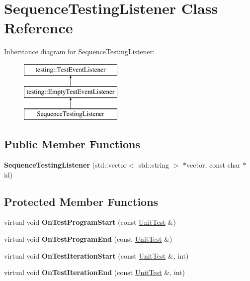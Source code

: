 \hypertarget{class_sequence_testing_listener}{}\section{Sequence\+Testing\+Listener Class Reference}
\label{class_sequence_testing_listener}
Inheritance diagram for Sequence\+Testing\+Listener\+:\begin{figure}[H]
\begin{center}
\leavevmode
\includegraphics[height=3.000000cm]{class_sequence_testing_listener}
\end{center}
\end{figure}
\subsection*{Public Member Functions}
\begin{DoxyCompactItemize}
\item 
\mbox{\label{class_sequence_testing_listener_ac0fcb350d20876f8273621ad4c79ba7a}} 
{\bfseries Sequence\+Testing\+Listener} (std\+::vector$<$ std\+::string $>$ $\ast$vector, const char $\ast$id)
\end{DoxyCompactItemize}
\subsection*{Protected Member Functions}
\begin{DoxyCompactItemize}
\item 
\mbox{\label{class_sequence_testing_listener_a25b96acdbaa6f582e583e6b56bd39b42}} 
virtual void {\bfseries On\+Test\+Program\+Start} (const \mbox{\hyperlink{classtesting_1_1_unit_test}{Unit\+Test}} \&)
\item 
\mbox{\label{class_sequence_testing_listener_aacac5e15bac089460841ff63a5c31f57}} 
virtual void {\bfseries On\+Test\+Program\+End} (const \mbox{\hyperlink{classtesting_1_1_unit_test}{Unit\+Test}} \&)
\item 
\mbox{\label{class_sequence_testing_listener_a345641262fa10cc4b251ac54116db74b}} 
virtual void {\bfseries On\+Test\+Iteration\+Start} (const \mbox{\hyperlink{classtesting_1_1_unit_test}{Unit\+Test}} \&, int)
\item 
\mbox{\label{class_sequence_testing_listener_a783bc01e2a95f5bf73bbde4d96832e0f}} 
virtual void {\bfseries On\+Test\+Iteration\+End} (const \mbox{\hyperlink{classtesting_1_1_unit_test}{Unit\+Test}} \&, int)
\end{DoxyCompactItemize}
